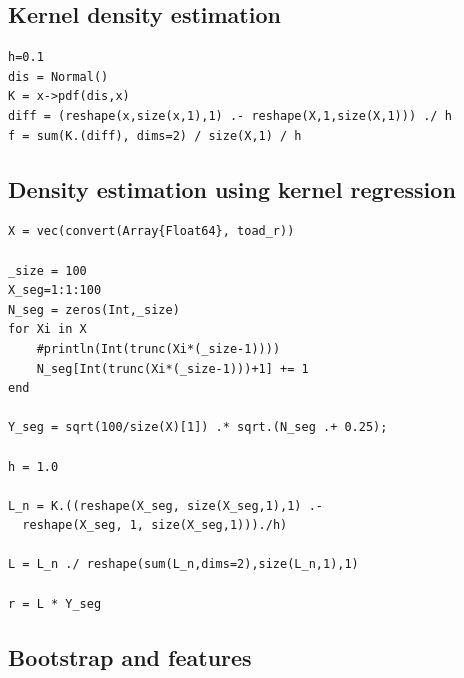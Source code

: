 \documentclass{article}
\begin{document}
\subsection{Kernel density estimation}

\begin{lstlisting}
h=0.1
dis = Normal()
K = x->pdf(dis,x)
diff = (reshape(x,size(x,1),1) .- reshape(X,1,size(X,1))) ./ h
f = sum(K.(diff), dims=2) / size(X,1) / h
\end{lstlisting}

\subsection{Density estimation using kernel regression}

\begin{lstlisting}
X = vec(convert(Array{Float64}, toad_r))

_size = 100
X_seg=1:1:100
N_seg = zeros(Int,_size)
for Xi in X
    #println(Int(trunc(Xi*(_size-1))))
    N_seg[Int(trunc(Xi*(_size-1)))+1] += 1
end

Y_seg = sqrt(100/size(X)[1]) .* sqrt.(N_seg .+ 0.25);

h = 1.0

L_n = K.((reshape(X_seg, size(X_seg,1),1) .- 
  reshape(X_seg, 1, size(X_seg,1)))./h)

L = L_n ./ reshape(sum(L_n,dims=2),size(L_n,1),1)

r = L * Y_seg

\end{lstlisting}

\subsection{Bootstrap and features}
\end{document}

